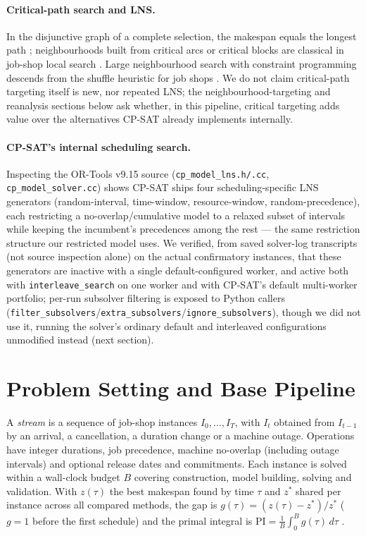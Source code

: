 \documentclass[letterpaper]{article} %
\begin{document}
\paragraph{Critical-path search and LNS.} In the disjunctive graph of a complete selection, the makespan equals the longest path \citep{balas1969}; neighbourhoods built from critical arcs or critical blocks are classical in job-shop local search \citep{vanlaarhoven1992,nowicki1996,balas1998}. Large neighbourhood search with constraint programming \citep{shaw1998,godard2005,pacino2011} descends from the shuffle heuristic for job shops \citep{applegate1991}. We do not claim critical-path targeting itself is new, nor repeated LNS; the neighbourhood-targeting and reanalysis sections below ask whether, in this pipeline, critical targeting adds value over the alternatives CP-SAT already implements internally.

\paragraph{CP-SAT's internal scheduling search.} Inspecting the OR-Tools v9.15 source (\texttt{cp\_model\_lns.h/.cc}, \texttt{cp\_model\_solver.cc}) shows CP-SAT ships four scheduling-specific LNS generators (random-interval, time-window, resource-window, random-precedence), each restricting a no-overlap/cumulative model to a relaxed subset of intervals while keeping the incumbent's precedences among the rest --- the same restriction structure our restricted model uses. We verified, from saved solver-log transcripts (not source inspection alone) on the actual confirmatory instances, that these generators are inactive with a single default-configured worker, and active both with \texttt{interleave\_search} on one worker and with CP-SAT's default multi-worker portfolio; per-run subsolver filtering is exposed to Python callers (\texttt{fil\-ter\_\-sub\-solvers}/\texttt{ex\-tra\_\-sub\-solvers}/\texttt{ig\-nore\_\-sub\-solvers}), though we did not use it, running the solver's ordinary default and interleaved configurations unmodified instead (next section).

\section{Problem Setting and Base Pipeline}

A \emph{stream} is a sequence of job-shop instances $I_0,\dots,I_T$, with $I_t$ obtained from $I_{t-1}$ by an arrival, a cancellation, a duration change or a machine outage. Operations have integer durations, job precedence, machine no-overlap (including outage intervals) and optional release dates and commitments. Each instance is solved within a wall-clock budget $B$ covering construction, model building, solving and validation. With $z(\tau)$ the best makespan found by time $\tau$ and $z^*$ shared per instance across all compared methods, the gap is $g(\tau)=(z(\tau)-z^*)/z^*$ ($g=1$ before the first schedule) and the primal integral is $\mathrm{PI}=\frac1B\int_0^B g(\tau)\,d\tau$ \citep{berthold2013}.
\end{document}
